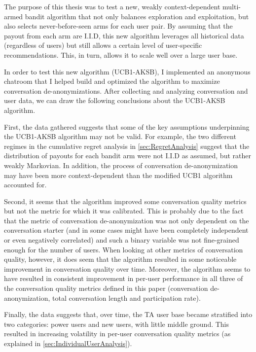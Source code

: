 The purpose of this thesis was to test a new, weakly context-dependent multi-armed bandit algorithm that not only balances exploration and exploitation, but also selects never-before-seen arms for each user pair. By assuming that the payout from each arm are I.I.D, this new algorithm leverages all historical data (regardless of users) but still allows a certain level of user-specific recommendations. This, in turn, allows it to scale well over a large user base. 

In order to test this new algorithm (UCB1-AKSB), I implemented an anonymous chatroom that I helped build and optimized the algorithm to maximize conversation de-anonymizations. After collecting and analyzing conversation and user data, we can draw the following conclusions about the UCB1-AKSB algorithm.

First, the data gathered suggests that some of the key assumptions underpinning the UCB1-AKSB algorithm may not be valid. For example, the two different regimes in the cumulative regret analysis in \autoref{sec:RegretAnalysis} suggest that the distribution of payouts for each bandit arm were not I.I.D as assumed, but rather weakly Markovian. In addition, the process of conversation de-anonymization may have been more context-dependent than the modified UCB1 algorithm accounted for.

Second, it seems that the algorithm improved some conversation quality metrics but not the metric for which it was calibrated. This is probably due to the fact that the metric of conversation de-anonymization was not only dependent on the conversation starter (and in some cases might have been completely independent or even negatively correlated) and such a binary variable was not fine-grained enough for the number of users. When looking at other metrics of conversation quality, however, it does seem that the algorithm resulted in some noticeable improvement in conversation quality over time. Moreover, the algorithm seems to have resulted in consistent improvement in per-user performance in all three of the conversation quality metrics defined in this paper (conversation de-anonymization, total conversation length and participation rate).

Finally, the data suggests that, over time, the TA user base became stratified into two categories: power users and new users, with little middle ground. This resulted in increasing volatility in per-user conversation quality metrics (as explained in \autoref{sec:IndividualUserAnalysis}).

